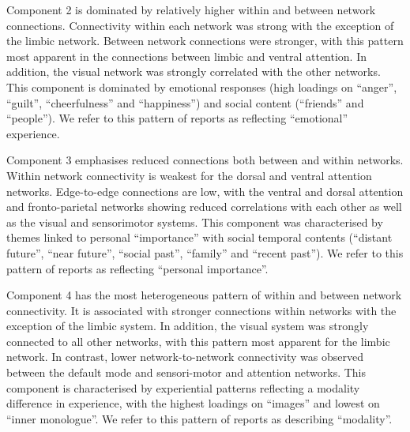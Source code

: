 Component 2 is dominated by relatively higher within and between network connections. Connectivity within each network was strong with the exception of the limbic network. Between network connections were stronger, with this pattern most apparent in the connections between limbic and ventral attention. In addition, the visual network was strongly correlated with the other networks. This component is dominated by emotional responses (high loadings on “anger”, “guilt”, “cheerfulness” and “happiness”) and social content (“friends” and “people”). We refer to this pattern of reports as reflecting “emotional” experience.

Component 3 emphasises reduced connections both between and within networks. Within network connectivity is weakest for the dorsal and ventral attention networks. Edge-to-edge connections are low, with the ventral and dorsal attention and fronto-parietal networks showing reduced correlations with each other as well as the visual and sensorimotor systems. This component was characterised by themes linked to personal “importance” with social temporal contents (“distant future”, “near future”, “social past”, “family” and “recent past”). We refer to this pattern of reports as reflecting “personal importance”.

Component 4 has the most heterogeneous pattern of within and between network connectivity. It is associated with stronger connections within networks with the exception of the limbic system. In addition, the visual system was strongly connected to all other networks, with this pattern most apparent for the limbic network. In contrast, lower network-to-network connectivity was observed between the default mode and sensori-motor and attention networks. This component is characterised by experiential patterns reflecting a modality difference in experience, with the highest loadings on “images” and lowest on “inner monologue”. We refer to this pattern of reports as describing “modality”. 


